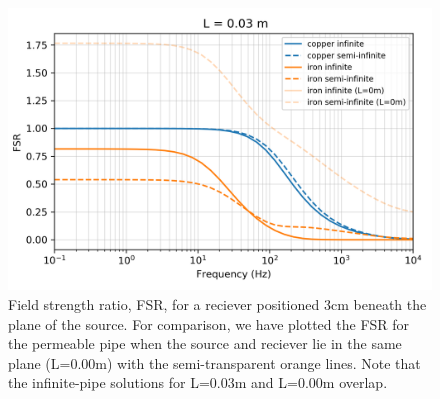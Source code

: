 \begin{figure}
    \begin{center}
    \includegraphics[width=0.6\columnwidth]{figures/casing_software/Augustin3cm.png}
    \end{center}
\caption{
    Field strength ratio, FSR, for a reciever positioned 3cm beneath
    the plane of the source. For comparison, we have plotted the
    FSR for the permeable pipe when the source and reciever lie in the same
    plane (L=0.00m) with the semi-transparent orange lines.
    Note that the infinite-pipe solutions for L=0.03m and L=0.00m overlap.
}
\label{fig:Augustin3cm}
\end{figure}
